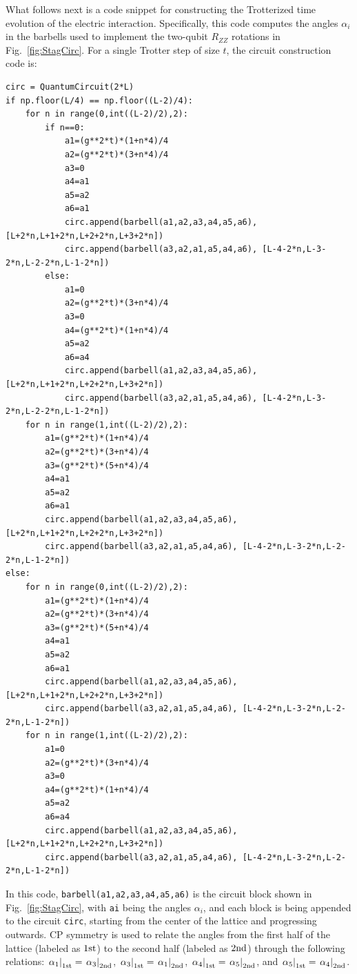 \documentclass[aps, prc, tightenlines,superscriptaddress, letterpaper, amsmath, amssymb, preprintnumbers, floatfix, longbibliography, nofootinbib]{revtex4-2}
\begin{document}
What follows next is a code snippet for constructing the Trotterized time evolution of the electric interaction.
Specifically, this code computes the angles $\alpha_i$ in the barbells used to implement the two-qubit $R_{ZZ}$ rotations in Fig.~\ref{fig:StagCirc}.
For a single Trotter step of size $t$, the circuit construction code is:
%
\lstset{language=Python}
\begin{lstlisting}
circ = QuantumCircuit(2*L)
if np.floor(L/4) == np.floor((L-2)/4):
    for n in range(0,int((L-2)/2),2):
        if n==0:
            a1=(g**2*t)*(1+n*4)/4
            a2=(g**2*t)*(3+n*4)/4
            a3=0
            a4=a1
            a5=a2
            a6=a1
            circ.append(barbell(a1,a2,a3,a4,a5,a6), [L+2*n,L+1+2*n,L+2+2*n,L+3+2*n])
            circ.append(barbell(a3,a2,a1,a5,a4,a6), [L-4-2*n,L-3-2*n,L-2-2*n,L-1-2*n])
        else:
            a1=0
            a2=(g**2*t)*(3+n*4)/4
            a3=0
            a4=(g**2*t)*(1+n*4)/4
            a5=a2
            a6=a4
            circ.append(barbell(a1,a2,a3,a4,a5,a6), [L+2*n,L+1+2*n,L+2+2*n,L+3+2*n])
            circ.append(barbell(a3,a2,a1,a5,a4,a6), [L-4-2*n,L-3-2*n,L-2-2*n,L-1-2*n])
    for n in range(1,int((L-2)/2),2):
        a1=(g**2*t)*(1+n*4)/4
        a2=(g**2*t)*(3+n*4)/4
        a3=(g**2*t)*(5+n*4)/4
        a4=a1
        a5=a2
        a6=a1
        circ.append(barbell(a1,a2,a3,a4,a5,a6), [L+2*n,L+1+2*n,L+2+2*n,L+3+2*n])
        circ.append(barbell(a3,a2,a1,a5,a4,a6), [L-4-2*n,L-3-2*n,L-2-2*n,L-1-2*n])
else:
    for n in range(0,int((L-2)/2),2):
        a1=(g**2*t)*(1+n*4)/4
        a2=(g**2*t)*(3+n*4)/4
        a3=(g**2*t)*(5+n*4)/4
        a4=a1
        a5=a2
        a6=a1
        circ.append(barbell(a1,a2,a3,a4,a5,a6), [L+2*n,L+1+2*n,L+2+2*n,L+3+2*n])
        circ.append(barbell(a3,a2,a1,a5,a4,a6), [L-4-2*n,L-3-2*n,L-2-2*n,L-1-2*n])
    for n in range(1,int((L-2)/2),2):
        a1=0
        a2=(g**2*t)*(3+n*4)/4
        a3=0
        a4=(g**2*t)*(1+n*4)/4
        a5=a2
        a6=a4
        circ.append(barbell(a1,a2,a3,a4,a5,a6), [L+2*n,L+1+2*n,L+2+2*n,L+3+2*n])
        circ.append(barbell(a3,a2,a1,a5,a4,a6), [L-4-2*n,L-3-2*n,L-2-2*n,L-1-2*n])
\end{lstlisting}
%
In this code, {\tt barbell(a1,a2,a3,a4,a5,a6)} is the circuit block shown in Fig.~\ref{fig:StagCirc}, with {\tt ai} being the angles $\alpha_i$, and each block is being appended to the circuit {\tt circ}, starting from the center  of the lattice 
and progressing outwards. 
CP symmetry is used to relate the angles from the first half of the lattice (labeled as $1{\rm st}$) to the second half (labeled as $2{\rm nd}$) through   the following relations: $\left. \alpha_1 \right|_{1{\rm st}} = \left. \alpha_3 \right|_{2{\rm nd}}$, $\left. \alpha_3 \right|_{1{\rm st}} = \left. \alpha_1 \right|_{2{\rm nd}}$, $\left. \alpha_4 \right|_{1{\rm st}} = \left. \alpha_5 \right|_{2{\rm nd}}$, and $\left. \alpha_5 \right|_{1{\rm st}} = \left. \alpha_4 \right|_{2{\rm nd}}$. 
\end{document}
